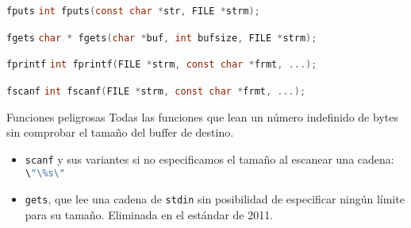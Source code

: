 \documentclass{mybeamer}
\begin{document}
\begin{framesubsec}{\texttt{fputs}}
	\lstinline[language=C, basicstyle=\footnotesize]|int fputs(const char *str, FILE *strm);|
	\vspace{1em}

	
\end{framesubsec}

\begin{framesubsec}{\texttt{fgets}}
	\lstinline[language=C, basicstyle=\footnotesize]|char * fgets(char *buf, int bufsize, FILE *strm);|
	\vspace{1em}

	
\end{framesubsec}

\begin{framesubsec}{\texttt{fprintf}}
	\lstinline[language=C, basicstyle=\footnotesize]|int fprintf(FILE *strm, const char *frmt, ...);|
	\vspace{1em}

	
\end{framesubsec}

\begin{framesubsec}{\texttt{fscanf}}
	\lstinline[language=C, basicstyle=\footnotesize]|int fscanf(FILE *strm, const char *frmt, ...);|
	\vspace{1em}

	
\end{framesubsec}

\begin{framesec}{Funciones peligrosas}
	Todas las funciones que lean un número indefinido de bytes sin comprobar
	el tamaño del buffer de destino.

	\begin{itemize}
		\item \texttt{scanf} y sus variantes si no especificamos el
			tamaño al escanear una cadena:
			\lstinline[language=C]|\"\%s\"|
		\item \texttt{gets}, que lee una cadena de \texttt{stdin} sin
			posibilidad de especificar ningún límite para su tamaño.
			Eliminada en el estándar de 2011.
	\end{itemize}
\end{framesec}
\end{document}

